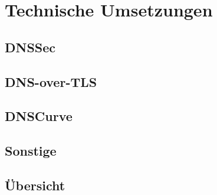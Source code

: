 \chapter{Technische Umsetzungen}

\section{DNSSec}

\section{DNS-over-TLS}

\section{DNSCurve}

\section{Sonstige}

\section{Übersicht}
